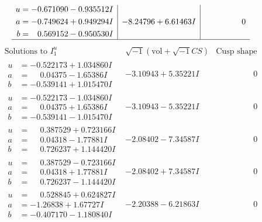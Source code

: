 \documentclass[1p]{elsarticle_modified}
\theoremstyle{definition}
\newcommand{\I}{\sqrt{-1}}
\begin{document}
$$\begin{array}{c|c|c}
\begin{aligned}
u &= -0.671090 - 0.935512 I \\
a &= -0.749624 + 0.949294 I \\
b &= \phantom{-}0.569152 - 0.950530 I\end{aligned}
 & -8.24796 + 6.61463 I & \phantom{-0.000000 } 0\\
 \hline 
 \end{array}$$\newpage$$\begin{array}{c|c|c}  
\text{Solutions to }I^u_{1}& \I (\text{vol} + \sqrt{-1}CS) & \text{Cusp shape}\\
 \hline 
\begin{aligned}
u &= -0.522173 + 1.034860 I \\
a &= \phantom{-}0.04375 - 1.65386 I \\
b &= -0.539141 + 1.015470 I\end{aligned}
 & -3.10943 + 5.35221 I & \phantom{-0.000000 } 0 \\ \hline\begin{aligned}
u &= -0.522173 - 1.034860 I \\
a &= \phantom{-}0.04375 + 1.65386 I \\
b &= -0.539141 - 1.015470 I\end{aligned}
 & -3.10943 - 5.35221 I & \phantom{-0.000000 } 0 \\ \hline\begin{aligned}
u &= \phantom{-}0.387529 + 0.723166 I \\
a &= \phantom{-}0.04318 - 1.77881 I \\
b &= \phantom{-}0.726237 + 1.144420 I\end{aligned}
 & -2.08402 - 7.34587 I & \phantom{-0.000000 } 0 \\ \hline\begin{aligned}
u &= \phantom{-}0.387529 - 0.723166 I \\
a &= \phantom{-}0.04318 + 1.77881 I \\
b &= \phantom{-}0.726237 - 1.144420 I\end{aligned}
 & -2.08402 + 7.34587 I & \phantom{-0.000000 } 0 \\ \hline\begin{aligned}
u &= \phantom{-}0.528845 + 0.624827 I \\
a &= -1.26838 + 1.67727 I \\
b &= -0.407170 - 1.180840 I\end{aligned}
 & -2.20388 - 6.21863 I & \phantom{-0.000000 } 0 \\ \hline\begin{aligned}

\end{aligned}
\end{array}$$
\end{document}

